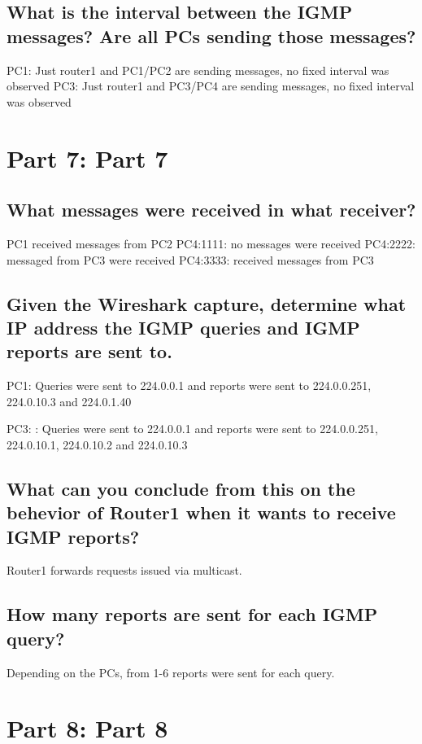 \documentclass[a4paper, 11pt]{article}
\begin{document}
\subsection{What is the interval between the IGMP messages? Are all PCs sending those messages? }

PC1: Just router1 and PC1/PC2 are sending messages, no fixed interval was observed
PC3: Just router1 and PC3/PC4 are sending messages, no fixed interval was observed 

\section{Part 7: Part 7}

\subsection{What messages were received in what receiver?}

PC1 received messages from PC2
PC4:1111: no messages were received
PC4:2222: messaged from PC3 were received
PC4:3333: received messages from PC3

\subsection{Given the Wireshark capture, determine what IP address the IGMP queries and IGMP reports are sent to. }


PC1: Queries were sent to 224.0.0.1 and reports were sent to 224.0.0.251, 224.0.10.3 and 224.0.1.40

PC3: : Queries were sent to 224.0.0.1 and reports were sent to 224.0.0.251, 224.0.10.1, 224.0.10.2 and 224.0.10.3

\subsection{What can you conclude from this on the behevior of Router1 when it wants to receive IGMP reports? }

Router1 forwards requests issued via multicast.

\subsection{How many reports are sent for each IGMP query? }

Depending on the PCs, from 1-6 reports were sent for each query.

\section{Part 8: Part 8}
\end{document}
